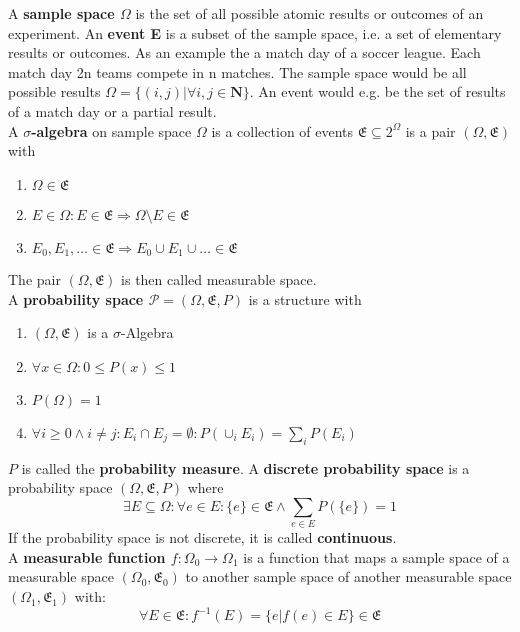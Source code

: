 A \textbf{sample space $\Omega$} is the set of all possible atomic results or outcomes of an experiment. An \textbf{event E} is a subset of the sample space, i.e. a set of elementary results or outcomes. As an example the a match day of a soccer league. Each match day 2n teams compete in n matches. The sample space would be all possible results $\Omega = \{ (i,j)| \forall i,j \in \mathbf{N}\}$. An event would e.g. be the set of results of a match day or a partial result. \\

A \textbf{$\sigma$-algebra} on sample space $\Omega$ is a collection of events $\mathfrak{E} \subseteq 2^{\Omega}$ is a pair $(\Omega, \mathfrak{E})$ with
\begin{enumerate}
    \item $\Omega \in \mathfrak{E}$
    \item $E \in \Omega: E \in \mathfrak{E} \Rightarrow \Omega \setminus E \in \mathfrak{E}$
    \item $E_0, E_1, \dots \in \mathfrak{E} \Rightarrow E_0 \cup E_1 \cup \dots \in \mathfrak{E}$
\end{enumerate}
The pair $(\Omega, \mathfrak{E})$ is then called measurable space. \\

A \textbf{probability space $\mathcal{P} = (\Omega, \mathfrak{E}, P)$} is a structure with
\begin{enumerate}
    \item $(\Omega, \mathfrak{E})$ is a $\sigma$-Algebra
    \item $\forall x \in \Omega: 0 \leq P(x) \leq 1$
    \item $P(\Omega) = 1$
    \item $\forall i \geq 0 \wedge i \neq j: E_i \cap E_j = \emptyset: P(\cup_i E_i) = \sum_i P(E_i)$ 
\end{enumerate}
$P$ is called the \textbf{probability measure}.
\vspace{0.5cm}
A \textbf{discrete probability space} is a probability space $(\Omega, \mathfrak{E}, P)$ where 
\[ \exists E \subseteq \Omega: \forall e \in E: \{e\} \in \mathfrak{E} \wedge \sum_{e \in E} P(\{e\}) = 1\]
If the probability space is not discrete, it is called \textbf{continuous}. \\

A \textbf{measurable function $f:\Omega_0 \rightarrow \Omega_1$} is a function that maps a sample space of a measurable space $(\Omega_0, \mathfrak{E}_0)$ to another sample space of another measurable space $(\Omega_1, \mathfrak{E}_1)$ with:
\[ \forall E \in \mathfrak{E}: f^{-1}(E) = \{ e | f(e) \in E \} \in \mathfrak{E} \]

